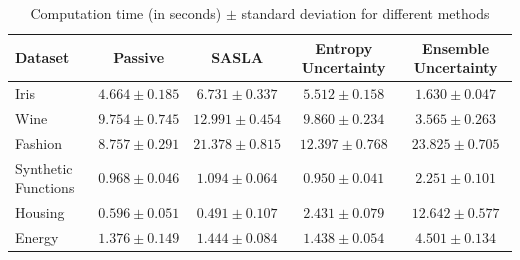 \documentclass[10pt, conference]{IEEEtran}
\begin{document}
\begin{table}[ht]
	\caption{Computation time (in seconds) $\pm$ standard deviation for different methods}
	\label{tab:computation_times}
	\centering
	\begin{tabular}{|l|c|c|c|c|}
		\hline
		\textbf{Dataset} & \textbf{Passive} & \textbf{SASLA} & \textbf{Entropy Uncertainty} & \textbf{Ensemble Uncertainty} \\
		\hline
		Iris & $4.664 \pm 0.185$ & $6.731 \pm 0.337$ & $5.512 \pm 0.158$ & $1.630 \pm 0.047$ \\
		\hline
		Wine & $9.754 \pm 0.745$ & $12.991 \pm 0.454$ & $9.860 \pm 0.234$ & $3.565 \pm 0.263$ \\
		\hline
		Fashion & $8.757 \pm 0.291$ & $21.378 \pm 0.815$ & $12.397 \pm 0.768$ & $23.825 \pm 0.705$ \\
		\hline
		Synthetic Functions & $0.968 \pm 0.046$ & $1.094 \pm 0.064$ & $0.950 \pm 0.041$ & $2.251 \pm 0.101$ \\
		\hline
		Housing & $0.596 \pm 0.051$ & $0.491 \pm 0.107$ & $2.431 \pm 0.079$ & $12.642 \pm 0.577$ \\
		\hline
		Energy & $1.376 \pm 0.149$ & $1.444 \pm 0.084$ & $1.438 \pm 0.054$ & $4.501 \pm 0.134$ \\
		\hline
	\end{tabular}
\end{table}
\end{document}
